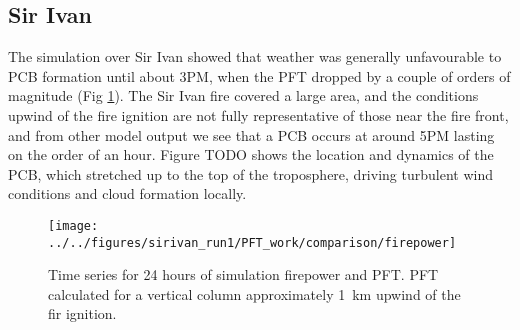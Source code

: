   
  \subsection{Sir Ivan}
    \label{pcb:sirivan}
    
    The simulation over Sir Ivan showed that weather was generally unfavourable to PCB formation until about 3PM, when the PFT dropped by a couple of orders of magnitude (Fig \ref{fig:pcb:sirivan:pft_series}).
    The Sir Ivan fire covered a large area, and the conditions upwind of the fire ignition are not fully representative of those near the fire front, and from other model output we see that a PCB occurs at around 5PM lasting on the order of an hour.
    Figure TODO shows the location and dynamics of the PCB, which stretched up to the top of the troposphere, driving turbulent wind conditions and cloud formation locally.
    
    \begin{figure}
      \centering
      \texttt{[image: ../../figures/sirivan\_run1/PFT\_work/comparison/firepower]}
      \caption{%
        Time series for 24 hours of simulation firepower and PFT.
        PFT calculated for a vertical column approximately 1~km upwind of the fir ignition.
        }
      \label{fig:pcb:sirivan:pft_series}
    \end{figure}
